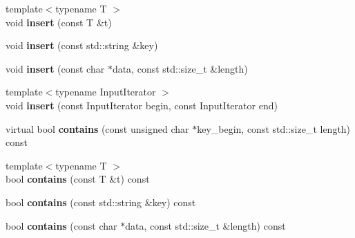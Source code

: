\begin{DoxyCompactItemize}
\item 
\hypertarget{classstrtk_1_1bloom_1_1filter_a7384814d47e8969f0ee0420737f2d30e}{{\footnotesize template$<$typename T $>$ }\\void {\bfseries insert} (const T \&t)}\label{classstrtk_1_1bloom_1_1filter_a7384814d47e8969f0ee0420737f2d30e}

\item 
\hypertarget{classstrtk_1_1bloom_1_1filter_a0c6789bceec08fe13f18780ae7a95794}{void {\bfseries insert} (const std\-::string \&key)}\label{classstrtk_1_1bloom_1_1filter_a0c6789bceec08fe13f18780ae7a95794}

\item 
\hypertarget{classstrtk_1_1bloom_1_1filter_ae11f9ff2d525f96fbf73a54360ce2dfc}{void {\bfseries insert} (const char $\ast$data, const std\-::size\-\_\-t \&length)}\label{classstrtk_1_1bloom_1_1filter_ae11f9ff2d525f96fbf73a54360ce2dfc}

\item 
\hypertarget{classstrtk_1_1bloom_1_1filter_ab6709ff6d419246b4783ee3d1b83e774}{{\footnotesize template$<$typename Input\-Iterator $>$ }\\void {\bfseries insert} (const Input\-Iterator begin, const Input\-Iterator end)}\label{classstrtk_1_1bloom_1_1filter_ab6709ff6d419246b4783ee3d1b83e774}

\item 
\hypertarget{classstrtk_1_1bloom_1_1filter_a01d6696b427a79989a233ccac7b93c55}{virtual bool {\bfseries contains} (const unsigned char $\ast$key\-\_\-begin, const std\-::size\-\_\-t length) const }\label{classstrtk_1_1bloom_1_1filter_a01d6696b427a79989a233ccac7b93c55}

\item 
\hypertarget{classstrtk_1_1bloom_1_1filter_a8023755487ce5ab8c0f8d034ff5a08f4}{{\footnotesize template$<$typename T $>$ }\\bool {\bfseries contains} (const T \&t) const }\label{classstrtk_1_1bloom_1_1filter_a8023755487ce5ab8c0f8d034ff5a08f4}

\item 
\hypertarget{classstrtk_1_1bloom_1_1filter_acd1dc0548198ceef2645b58cd9eff5e4}{bool {\bfseries contains} (const std\-::string \&key) const }\label{classstrtk_1_1bloom_1_1filter_acd1dc0548198ceef2645b58cd9eff5e4}

\item 
\hypertarget{classstrtk_1_1bloom_1_1filter_a0c5a99678eaa21d30f45caa29aeefba4}{bool {\bfseries contains} (const char $\ast$data, const std\-::size\-\_\-t \&length) const }\label{classstrtk_1_1bloom_1_1filter_a0c5a99678eaa21d30f45caa29aeefba4}


\end{DoxyCompactItemize}
